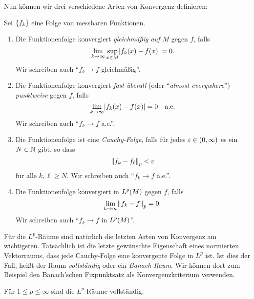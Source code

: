 Nun können wir drei verschiedene Arten von Konvergenz definieren:

\begin{definition}
	Sei \(\braces*{f_k}\) eine Folge von messbaren Funktionen.
	\begin{enumerate}
		\item Die Funktionenfolge konvergiert \emph{gleichmäßig auf \(M\)} gegen \(f\), falls
		\[
			\lim_{k \to \infty}\sup_{x \in M}\absolute*{f_k\parentheses*{x} - f\parentheses*{x}} = 0.
		\]
		Wir schreiben auch ``\(f_k \to f\) gleichmäßig''.
		\item Die Funktionenfolge konvergiert \emph{fast überall} (oder ``\emph{almost everywhere}'') \emph{punktweise} gegen \(f\), falls
		\[
			\lim_{k \to \infty}\absolute*{f_k\parentheses*{x} - f\parentheses*{x}} = 0 \quad \text{a.e.}
		\]
		Wir schreiben auch ``\(f_k \to f\) a.e.''.
		\item Die Funktionenfolge ist eine \emph{Cauchy-Folge}, falls für jedes \(\varepsilon \in \parentheses*{0, \infty}\) es ein \(N \in \N\) gibt, so dass
		\[
			\norm*{f_k - f_\ell}_p < \varepsilon
		\]
		für alle \(k, \ell \ge N\).
		Wir schreiben auch ``\(f_k \to f\) a.e.''.
		\item Die Funktionenfolge konvergiert in \(L^p\parentheses*{M}\) gegen \(f\), falls
		\[
			\lim_{k \to \infty}\norm*{f_k - f}_p = 0.
		\]
		Wir schreiben auch ``\(f_k \to f\) in \(L^p\parentheses*{M}\)''.
	\end{enumerate}
\end{definition}

Für die \(L^p\)-Räume sind natürlich die letzten Arten von Konvergenz am wichtigsten.
Tatsächlich ist die letzte gewünschte Eigenschaft eines normierten Vektorraums, dass jede Cauchy-Folge eine konvergente Folge in \(L^p\) ist.
Ist dies der Fall, heißt der Raum \emph{vollständig} oder ein \emph{Banach-Raum}.
Wir können dort zum Beispiel den Banach'schen Fixpunktsatz als Konvergenzkriterium verwenden.

\begin{proposition}
	Für \(1 \le p \le \infty\) sind die \(L^p\)-Räume vollständig.
\end{proposition}

